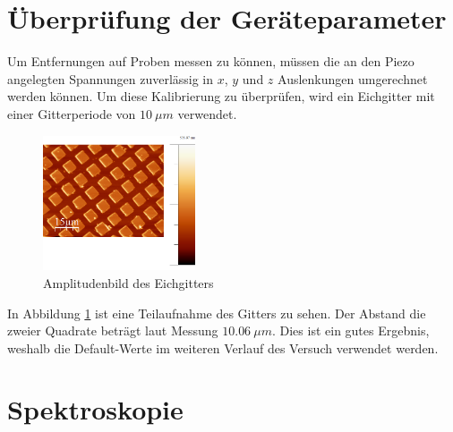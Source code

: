     \section{Überprüfung der Geräteparameter}

Um Entfernungen auf Proben messen zu können, müssen die an den Piezo angelegten 
Spannungen zuverlässig in $x$, $y$ und $z$ Auslenkungen umgerechnet werden können.
Um diese Kalibrierung zu überprüfen, wird ein Eichgitter mit einer Gitterperiode
von  $\SI{10}{\mu m}$ verwendet.
\begin{figure}[hb]
    \centering
    \includegraphics[width=0.4\textwidth]{Mess/gitter_paint.png}
    \caption{Amplitudenbild des Eichgitters}
    \label{gitter}
\end{figure}
In Abbildung \ref{gitter} ist eine Teilaufnahme des Gitters zu sehen. Der Abstand die 
zweier Quadrate beträgt laut Messung $\SI{10,06}{\mu m}$. Dies ist ein gutes 
Ergebnis, weshalb die Default-Werte im weiteren Verlauf des Versuch verwendet 
werden.

    \section{Spektroskopie}

